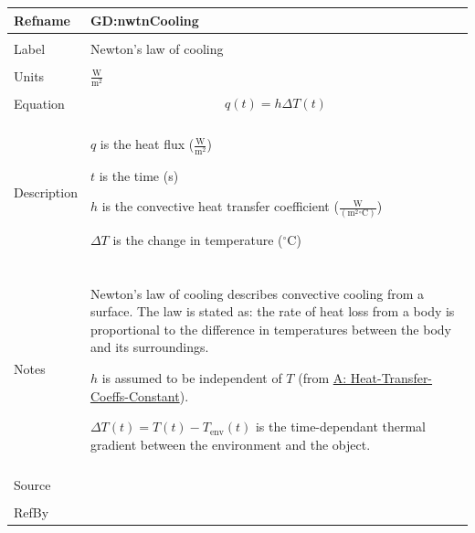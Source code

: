 \documentclass[12pt]{article}
\begin{document}
\vspace{\baselineskip}
\noindent
\begin{minipage}{\textwidth}
\begin{tabular}{>{\raggedright}p{}>{\raggedright\arraybackslash}p{}}
\toprule \textbf{Refname} & \textbf{GD:nwtnCooling}
\label{GD:nwtnCooling}
\\ \midrule \\
Label & Newton's law of cooling
        
\\ \midrule \\
Units & $\frac{\text{W}}{\text{m}^{2}}$
        
\\ \midrule \\
Equation & \begin{displaymath}
           q\left(t\right)=h ΔT\left(t\right)
           \end{displaymath}
\\ \midrule \\
Description & \begin{symbDescription}
              \item{$q$ is the heat flux ($\frac{\text{W}}{\text{m}^{2}}$)}
              \item{$t$ is the time (s)}
              \item{$h$ is the convective heat transfer coefficient ($\frac{\text{W}}{(\text{m}^{2}{}^{\circ}\text{C})}$)}
              \item{$ΔT$ is the change in temperature (${}^{\circ}$C)}
              \end{symbDescription}
\\ \midrule \\
Notes & Newton's law of cooling describes convective cooling from a surface. The law is stated as: the rate of heat loss from a body is proportional to the difference in temperatures between the body and its surroundings.
        
        $h$ is assumed to be independent of $T$ (from \hyperref[assumpHTCC]{A: Heat-Transfer-Coeffs-Constant}).
        
        $ΔT\left(t\right)=T\left(t\right)-{T_{\text{env}}}\left(t\right)$ is the time-dependant thermal gradient between the environment and the object.
        
\\ \midrule \\
Source & \cite[(pg. 8)]{incroperaEtAl2007}
         
\\ \midrule \\
RefBy & 
\\ \bottomrule
\end{tabular}
\end{minipage}
\end{document}
